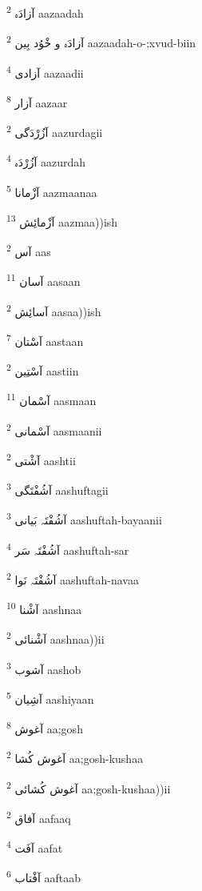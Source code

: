\documentclass[12pt]{article}
\begin{document}
\begin{RTL}
\begin{multicols}{5}
{\ur آزادَہ}   \textsuperscript{2} aazaadah

{\ur آزادَہ و خْوُد بِین}   \textsuperscript{2} aazaadah-o-;xvud-biin

{\ur آزادی}   \textsuperscript{4} aazaadii

{\ur آزار}   \textsuperscript{8} aazaar

{\ur آزُرْدَگی}   \textsuperscript{2} aazurdagii

{\ur آزُرْدَہ}   \textsuperscript{4} aazurdah

{\ur آزْمانا}   \textsuperscript{5} aazmaanaa

{\ur آزْمائِش}   \textsuperscript{13} aazmaa))ish

{\ur آس}   \textsuperscript{2} aas

{\ur آسان}   \textsuperscript{11} aasaan

{\ur آسائِش}   \textsuperscript{2} aasaa))ish

{\ur آسْتان}   \textsuperscript{7} aastaan

{\ur آسْتِین}   \textsuperscript{2} aastiin

{\ur آسْمان}   \textsuperscript{11} aasmaan

{\ur آسْمانی}   \textsuperscript{2} aasmaanii

{\ur آشْتی}   \textsuperscript{2} aashtii

{\ur آشُفْتَگی}   \textsuperscript{3} aashuftagii

{\ur آشُفْتَہ بَیانی}   \textsuperscript{3} aashuftah-bayaanii

{\ur آشُفْتَہ سَر}   \textsuperscript{4} aashuftah-sar

{\ur آشُفْتَہ نَوا}   \textsuperscript{2} aashuftah-navaa

{\ur آشْنا}   \textsuperscript{10} aashnaa

{\ur آشْنائی}   \textsuperscript{2} aashnaa))ii

{\ur آشوب}   \textsuperscript{3} aashob

{\ur آشِیان}   \textsuperscript{5} aashiyaan

{\ur آغوش}   \textsuperscript{8} aa;gosh

{\ur آغوش کُشا}   \textsuperscript{2} aa;gosh-kushaa

{\ur آغوش کُشائی}   \textsuperscript{2} aa;gosh-kushaa))ii

{\ur آفاق}   \textsuperscript{2} aafaaq

{\ur آفَت}   \textsuperscript{4} aafat

{\ur آفْتاب}   \textsuperscript{6} aaftaab


\end{multicols}
\end{RTL}
\end{document}
